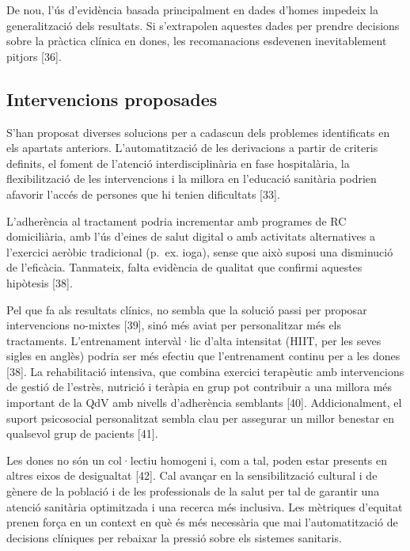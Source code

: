 \documentclass[CAT]{TFUOC}%
\begin{document}
De nou, l'ús d'evidència basada principalment en dades d'homes impedeix la generalització dels resultats. Si s'extrapolen aquestes dades per prendre decisions sobre la pràctica clínica en dones, les recomanacions esdevenen inevitablement pitjors {[}36{]}.

\subsection{Intervencions proposades}\label{intervencions-proposades}

S'han proposat diverses solucions per a cadascun dels problemes identificats en els apartats anteriors. L'automatització de les derivacions a partir de criteris definits, el foment de l'atenció interdisciplinària en fase hospitalària, la flexibilització de les intervencions i la millora en l'educació sanitària podrien afavorir l'accés de persones que hi tenien dificultats {[}33{]}.

L'adherència al tractament podria incrementar amb programes de RC domiciliària, amb l'ús d'eines de salut digital o amb activitats alternatives a l'exercici aeròbic tradicional (p.~ex. ioga), sense que això suposi una disminució de l'eficàcia. Tanmateix, falta evidència de qualitat que confirmi aquestes hipòtesis {[}38{]}.

Pel que fa als resultats clínics, no sembla que la solució passi per proposar intervencions no-mixtes {[}39{]}, sinó més aviat per personalitzar més els tractaments. L'entrenament intervàl·lic d'alta intensitat (HIIT, per les seves sigles en anglès) podria ser més efectiu que l'entrenament continu per a les dones {[}38{]}. La rehabilitació intensiva, que combina exercici terapèutic amb intervencions de gestió de l'estrès, nutrició i teràpia en grup pot contribuir a una millora més important de la QdV amb nivells d'adherència semblants {[}40{]}. Addicionalment, el suport psicosocial personalitzat sembla clau per assegurar un millor benestar en qualsevol grup de pacients {[}41{]}.

Les dones no són un col·lectiu homogeni i, com a tal, poden estar presents en altres eixos de desigualtat {[}42{]}. Cal avançar en la sensibilització cultural i de gènere de la població i de les professionals de la salut per tal de garantir una atenció sanitària optimitzada i una recerca més inclusiva. Les mètriques d'equitat prenen força en un context en què és més necessària que mai l'automatització de decisions clíniques per rebaixar la pressió sobre els sistemes sanitaris.
\end{document}
